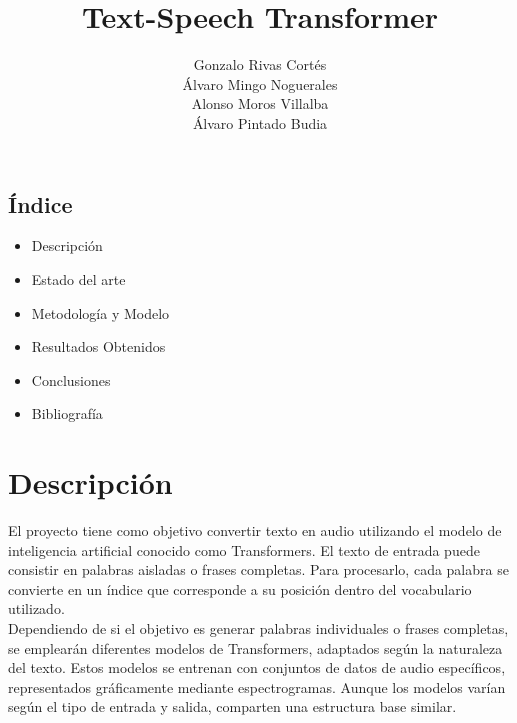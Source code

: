 \documentclass{article}
\title{\Huge Text-Speech Transformer}
\author{Gonzalo Rivas Cortés \\
Álvaro Mingo Noguerales \\
Alonso Moros Villalba \\
Álvaro Pintado Budia}
\begin{document}
\maketitle

\newpage
\begin{Large}
\section{\Huge Índice}
\vspace{0.5cm}
\begin{itemize}
    \item Descripción
    \vspace{0.75cm}
    \item Estado del arte
    \vspace{0.75cm}
    \item Metodología y Modelo
    \vspace{0.75cm}
    \item Resultados Obtenidos
    \vspace{0.75cm}
    \item Conclusiones
    \vspace{0.75cm}
    \item Bibliografía
\end{itemize}
\end{Large}

\newpage
\section{\Huge Descripción}
\begin{Large}
\vspace{0.5cm}
El proyecto tiene como objetivo convertir texto en audio utilizando el modelo de inteligencia artificial conocido como Transformers. El texto de entrada puede consistir en palabras aisladas o frases completas. Para procesarlo, cada palabra se convierte en un índice que corresponde a su posición dentro del vocabulario utilizado.\\

Dependiendo de si el objetivo es generar palabras individuales o frases completas, se emplearán diferentes modelos de Transformers, adaptados según la naturaleza del texto. Estos modelos se entrenan con conjuntos de datos de audio específicos, representados gráficamente mediante espectrogramas. Aunque los modelos varían según el tipo de entrada y salida, comparten una estructura base similar.
\end{Large}
\end{document}
